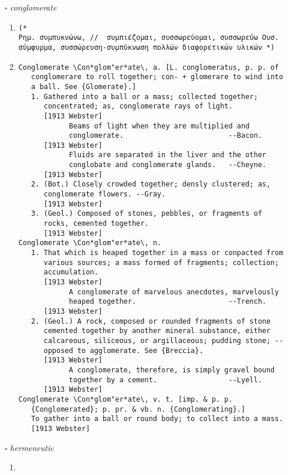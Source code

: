 \documentclass{article}
\begin{document}
\begin{itemize}
\item[$\square$] \emph{ conglomerate }
\begin{enumerate}
\item{
\begin{lstlisting}
(* 
Ρημ. συμπυκνώνω, //  συμπιέζομαι, συσσωρεύομαι, συσσωρεύω Ουσ. σύμφυρμα, συσσώρευση-συμπύκνωση πολλών διαφορετικών υλικών *)
\end{lstlisting}}
\item{
\begin{lstlisting}
Conglomerate \Con*glom"er*ate\, a. [L. conglomeratus, p. p. of
   conglomerare to roll together; con- + glomerare to wind into
   a ball. See {Glomerate}.]
   1. Gathered into a ball or a mass; collected together;
      concentrated; as, conglomerate rays of light.
      [1913 Webster]
            Beams of light when they are multiplied and
            conglomerate.                         --Bacon.
      [1913 Webster]
            Fluids are separated in the liver and the other
            conglobate and conglomerate glands.   --Cheyne.
      [1913 Webster]
   2. (Bot.) Closely crowded together; densly clustered; as,
      conglomerate flowers. --Gray.
      [1913 Webster]
   3. (Geol.) Composed of stones, pebbles, or fragments of
      rocks, cemented together.
      [1913 Webster]
Conglomerate \Con*glom"er*ate\, n.
   1. That which is heaped together in a mass or conpacted from
      various sources; a mass formed of fragments; collection;
      accumulation.
      [1913 Webster]
            A conglomerate of marvelous anecdotes, marvelously
            heaped together.                      --Trench.
      [1913 Webster]
   2. (Geol.) A rock, composed or rounded fragments of stone
      cemented together by another mineral substance, either
      calcareous, siliceous, or argillaceous; pudding stone; --
      opposed to agglomerate. See {Breccia}.
      [1913 Webster]
            A conglomerate, therefore, is simply gravel bound
            together by a cement.                 --Lyell.
      [1913 Webster]
Conglomerate \Con*glom"er*ate\, v. t. [imp. & p. p.
   {Conglomerated}; p. pr. & vb. n. {Conglomerating}.]
   To gather into a ball or round body; to collect into a mass.
   [1913 Webster]
\end{lstlisting}}
\end{enumerate}
\item[$\square$] \emph{ hermeneutic }
\begin{enumerate}
\item{
\begin{lstlisting}

\end{lstlisting}}
\end{enumerate}
\end{itemize}
\end{document}
